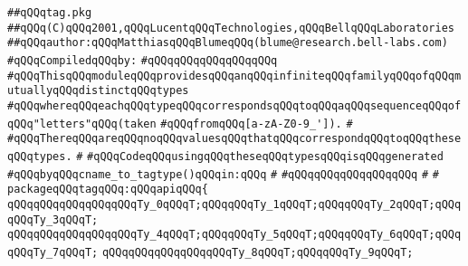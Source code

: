\label{src/lib/c-glue-lib/internals/tag.pkg}
\verb|##qQQqtag.pkg|\newline
\verb|##qQQq(C)qQQq2001,qQQqLucentqQQqTechnologies,qQQqBellqQQqLaboratories|\newline
\verb|##qQQqauthor:qQQqMatthiasqQQqBlumeqQQq(blume@research.bell-labs.com)|\newline
\newline
\verb|#qQQqCompiledqQQqby:|\newline
\verb|#qQQqqQQqqQQqqQQqqQQq|\newline
\newline
\newline
\newline
\verb|#qQQqThisqQQqmoduleqQQqprovidesqQQqanqQQqinfiniteqQQqfamilyqQQqofqQQqmutuallyqQQqdistinctqQQqtypes|\newline
\verb|#qQQqwhereqQQqeachqQQqtypeqQQqcorrespondsqQQqtoqQQqaqQQqsequenceqQQqofqQQq"letters"qQQq(taken|\newline
\verb|#qQQqfromqQQq[a-zA-Z0-9_']).|\newline
\verb|#|\newline
\verb|#qQQqThereqQQqareqQQqnoqQQqvaluesqQQqthatqQQqcorrespondqQQqtoqQQqtheseqQQqtypes.|\newline
\verb|#|\newline
\verb|#qQQqCodeqQQqusingqQQqtheseqQQqtypesqQQqisqQQqgenerated|\newline
\verb|#qQQqbyqQQqcname_to_tagtype()qQQqin:qQQq|\newline
\verb|#|\newline
\verb|#qQQqqQQqqQQqqQQqqQQq|\newline
\verb|#|\newline
\verb|#|\newline
\newline
\newline
\verb|packageqQQqtagqQQq:qQQqapiqQQq{|\newline
\newline
\verb|qQQqqQQqqQQqqQQqqQQqTy_0qQQqT;qQQqqQQqTy_1qQQqT;qQQqqQQqTy_2qQQqT;qQQqqQQqTy_3qQQqT;|\newline
\verb|qQQqqQQqqQQqqQQqqQQqTy_4qQQqT;qQQqqQQqTy_5qQQqT;qQQqqQQqTy_6qQQqT;qQQqqQQqTy_7qQQqT;|\newline
\verb|qQQqqQQqqQQqqQQqqQQqTy_8qQQqT;qQQqqQQqTy_9qQQqT;|\newline
